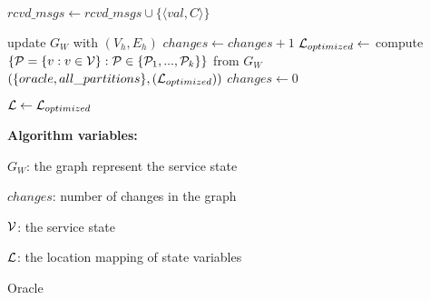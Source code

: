 \begin{algorithm}[htbp!]
\begin{distribalgo}[1]
\vspace{1.0mm}
	\STATE $rcvd\_msgs \leftarrow rcvd\_msgs \cup \{\langle val, C \rangle\}$
\ENDINDENT

\vspace{1.0mm}

	\STATE update $G_W$ with $(V_h,E_h)$
	\STATE $changes \leftarrow changes + 1$
		\STATE $\mathcal{L}_{optimized}  \leftarrow$ compute $\{\mathcal{P}=\{v:v \in \mathcal{V}\} : \mathcal{P} \in \{\mathcal{P}_1,...,\mathcal{P}_k\}\}$ from $G_W$
		\STATE \amcast$(\{oracle, all\_partitions\}, (\mathcal{L}_{optimized}))$
		\STATE $changes \leftarrow 0$
	\ENDIF
\ENDINDENT

\vspace{1.0mm}

	\STATE $\mathcal{L} \leftarrow \mathcal{L}_{optimized}$
\ENDINDENT

\vspace{1.5mm}

\textbf{Algorithm variables:}

\vspace{1mm}

$G_W$: the graph represent the service state

$changes$: number of changes in the graph


$\mathcal{V}$: the service state

$\mathcal{L}$: the location mapping of state variables


\caption{Oracle}
\label{alg:dynastar-oracle_proxy}
\end{distribalgo}
\end{algorithm}



